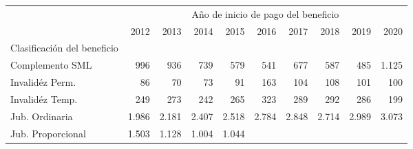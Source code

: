 \begin{tabular}{llllllllll}
\cline{1-10}
\multicolumn{1}{c}{} &
  \multicolumn{9}{|c}{Año de inicio de pago del beneficio} \\
\multicolumn{1}{c}{} &
  \multicolumn{1}{|r}{2012} &
  \multicolumn{1}{r}{2013} &
  \multicolumn{1}{r}{2014} &
  \multicolumn{1}{r}{2015} &
  \multicolumn{1}{r}{2016} &
  \multicolumn{1}{r}{2017} &
  \multicolumn{1}{r}{2018} &
  \multicolumn{1}{r}{2019} &
  \multicolumn{1}{r}{2020} \\
\cline{1-10}
\multicolumn{1}{l}{Clasificación del beneficio} &
  \multicolumn{1}{|r}{} &
  \multicolumn{1}{r}{} &
  \multicolumn{1}{r}{} &
  \multicolumn{1}{r}{} &
  \multicolumn{1}{r}{} &
  \multicolumn{1}{r}{} &
  \multicolumn{1}{r}{} &
  \multicolumn{1}{r}{} &
  \multicolumn{1}{r}{} \\
\multicolumn{1}{l}{\hspace{1em}Complemento SML} &
  \multicolumn{1}{|r}{996} &
  \multicolumn{1}{r}{936} &
  \multicolumn{1}{r}{739} &
  \multicolumn{1}{r}{579} &
  \multicolumn{1}{r}{541} &
  \multicolumn{1}{r}{677} &
  \multicolumn{1}{r}{587} &
  \multicolumn{1}{r}{485} &
  \multicolumn{1}{r}{1.125} \\
\multicolumn{1}{l}{\hspace{1em}Invalidéz Perm.} &
  \multicolumn{1}{|r}{86} &
  \multicolumn{1}{r}{70} &
  \multicolumn{1}{r}{73} &
  \multicolumn{1}{r}{91} &
  \multicolumn{1}{r}{163} &
  \multicolumn{1}{r}{104} &
  \multicolumn{1}{r}{108} &
  \multicolumn{1}{r}{101} &
  \multicolumn{1}{r}{100} \\
\multicolumn{1}{l}{\hspace{1em}Invalidéz Temp.} &
  \multicolumn{1}{|r}{249} &
  \multicolumn{1}{r}{273} &
  \multicolumn{1}{r}{242} &
  \multicolumn{1}{r}{265} &
  \multicolumn{1}{r}{323} &
  \multicolumn{1}{r}{289} &
  \multicolumn{1}{r}{292} &
  \multicolumn{1}{r}{286} &
  \multicolumn{1}{r}{199} \\
\multicolumn{1}{l}{\hspace{1em}Jub. Ordinaria} &
  \multicolumn{1}{|r}{1.986} &
  \multicolumn{1}{r}{2.181} &
  \multicolumn{1}{r}{2.407} &
  \multicolumn{1}{r}{2.518} &
  \multicolumn{1}{r}{2.784} &
  \multicolumn{1}{r}{2.848} &
  \multicolumn{1}{r}{2.714} &
  \multicolumn{1}{r}{2.989} &
  \multicolumn{1}{r}{3.073} \\
\multicolumn{1}{l}{\hspace{1em}Jub. Proporcional} &
  \multicolumn{1}{|r}{1.503} &
  \multicolumn{1}{r}{1.128} &
  \multicolumn{1}{r}{1.004} &
  \multicolumn{1}{r}{1.044} &

\end{tabular}
